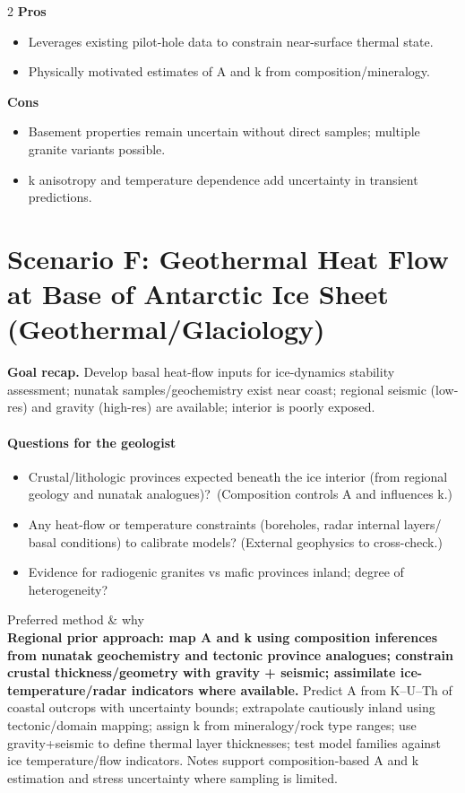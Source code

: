 \documentclass[11pt,a4paper]{article}
\begin{document}
\begin{multicols}{2}
\textbf{Pros}
\begin{itemize}[leftmargin=*]
  \item Leverages existing pilot-hole data to constrain near-surface thermal state.\label{notesref}
  \item Physically motivated estimates of A and k from composition/mineralogy.
\end{itemize}
\columnbreak
\textbf{Cons}
\begin{itemize}[leftmargin=*]
  \item Basement properties remain uncertain without direct samples; multiple granite variants possible.\label{notesref}
  \item k anisotropy and temperature dependence add uncertainty in transient predictions.
\end{itemize}
\end{multicols}

\section*{Scenario F: Geothermal Heat Flow at Base of Antarctic Ice Sheet (Geothermal/Glaciology)}
\textbf{Goal recap.} Develop basal heat-flow inputs for ice-dynamics stability assessment; nunatak samples/geochemistry exist near coast; regional seismic (low-res) and gravity (high-res) are available; interior is poorly exposed.

\paragraph{Questions for the geologist}
\begin{itemize}[leftmargin=*]
  \item Crustal/lithologic provinces expected beneath the ice interior (from regional geology and nunatak analogues)?~(Composition controls A and influences k.)\label{notesref}
  \item Any heat-flow or temperature constraints (boreholes, radar internal layers/\,basal conditions) to calibrate models? (External geophysics to cross-check.)
  \item Evidence for radiogenic granites vs mafic provinces inland; degree of heterogeneity?
\end{itemize}

Preferred method \& why\\
\textbf{Regional prior approach: map A and k using composition inferences from nunatak geochemistry and tectonic province analogues; constrain crustal thickness/geometry with gravity + seismic; assimilate ice-temperature/radar indicators where available.} Predict A from K--U--Th of coastal outcrops with uncertainty bounds; extrapolate cautiously inland using tectonic/domain mapping; assign k from mineralogy/rock type ranges; use gravity+seismic to define thermal layer thicknesses; test model families against ice temperature/flow indicators. Notes support composition-based A and k estimation and stress uncertainty where sampling is limited.\label{notesref}
\end{document}

